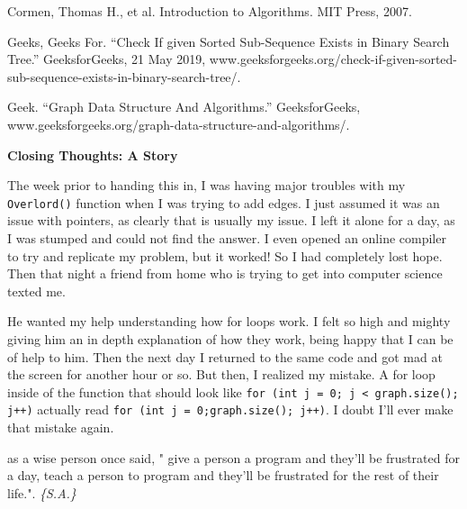 \documentclass[letterpaper, 10pt]{article}
\begin{document}
Cormen, Thomas H., et al. Introduction to Algorithms. MIT Press, 2007.

\vspace{1.5em}

Geeks, Geeks For. “Check If given Sorted Sub-Sequence Exists in Binary Search Tree.” GeeksforGeeks, 21 May 2019, www.geeksforgeeks.org/check-if-given-sorted-sub-sequence-exists-in-binary-search-tree/.

\vspace{1.5em}

Geek. “Graph Data Structure And Algorithms.” GeeksforGeeks, www.geeksforgeeks.org/graph-data-structure-and-algorithms/.

\newpage


\textbf{Closing Thoughts: A Story}

The week prior to handing this in, I was having major troubles with my \texttt{Overlord()} function when I was trying to add edges. I just assumed it was an issue with pointers, as clearly that is usually my issue. I left it alone for a day, as I was stumped and could not find the answer. I even opened an online compiler to try and replicate my problem, but it worked! So I had completely lost hope. Then that night a friend from home who is trying to get into computer science texted me. 

He wanted my help understanding how for loops work. I felt so high and mighty giving him an in depth explanation of how they work, being happy that I can be of help to him. Then the next day I returned to the same code and got mad at the screen for another hour or so. But then, I realized my mistake. A for loop inside of the function that should look like \newline \texttt{for (int j = 0; j < graph.size(); j++)} actually read \newline \texttt{for (int j = 0;graph.size(); j++)}. I doubt I'll ever make that mistake again.
\newline

as a wise person once said, "
give a person a program and they'll be
frustrated for a day, teach a person to
program and they'll be frustrated for the
rest of their life.".
 \vspace{.5em}
{\textit{\color{red}\huge{\{S.A.\}}}}
\vspace{1em}
\end{document}
